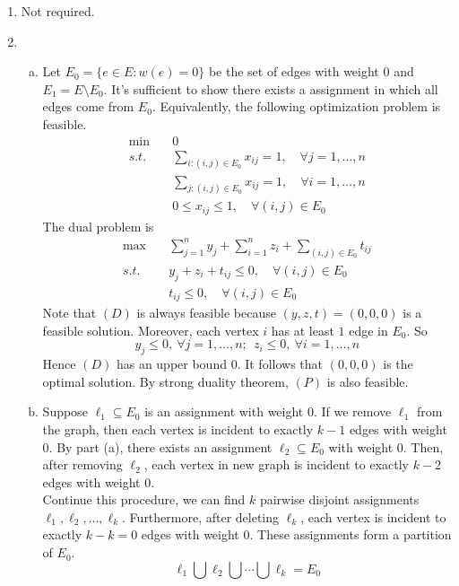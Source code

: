 \begin{enumerate}
	\newpage
	\item Not required.
	
	\newpage 
	\item \begin{enumerate}[(a)]
	
	\item Let $E_0 = \{e\in E: w(e) = 0\}$ be the set of edges with weight $0$ and $E_1 = E\setminus E_0$. It's sufficient to show there exists a assignment in which all edges come from $E_0$. Equivalently, the following optimization problem is feasible.
	\begin{align*}
	\min \quad & 0 \tag{P}\\
	s.t. \quad &\sum_{i: (i,j)\in E_0} x_{ij} = 1,\quad \forall j=1,\ldots,n\\
	&\sum_{j: (i,j)\in E_0} x_{ij} = 1,\quad \forall i=1,\ldots,n\\
	&0\le x_{ij} \le 1, \quad \forall (i,j)\in E_0 
	\end{align*}
	The dual problem is 
	\begin{align*}
	\max \quad & \sum_{j=1}^n y_j + \sum_{i=1}^n z_i + \sum_{ (i,j)\in E_0} t_{ij} \tag{D}\\
	s.t.\quad & y_j+z_i+t_{ij}\le 0, \quad \forall (i,j)\in E_0\\
	&t_{ij} \le 0, \quad \forall (i,j)\in E_0
	\end{align*} 
	Note that $(D)$ is always feasible because $(y,z,t) = (0,0,0)$ is a feasible solution. Moreover, each vertex $i$ has at least $1$ edge in $E_0$. So 
	\[
	y_j \le 0,~\forall j=1,\ldots,n;~~z_i\le 0,~\forall i=1,\ldots, n
	\] 
	Hence $(D)$ has an upper bound $0$. It follows that $(0,0,0)$ is the optimal solution. By strong duality theorem, $(P)$ is also feasible.
 	
 	\item Suppose $\ell_1 \subseteq E_0$ is an assignment with weight $0$. If we remove $\ell_1$ from the graph, then each vertex is incident to exactly $k-1$ edges with weight $0$. By part (a), there exists an assignment $\ell_2 \subseteq E_0$ with weight $0$. Then, after removing $\ell_2$, each vertex in new graph is incident to exactly $k-2$ edges with weight 0.\\ Continue this procedure, we can find $k$ pairwise disjoint assignments $\ell_1,\ell_2,\ldots, \ell_k$. 
 	Furthermore, after deleting $\ell_k$, each vertex is incident to exactly $k-k=0$ edges with weight $0$. These assignments form a partition of $E_0$.
 	\[
 	\ell_1 \bigcup \ell_2 \bigcup \cdots \bigcup \ell_k = E_0
 	\]
	\end{enumerate}
\end{enumerate}